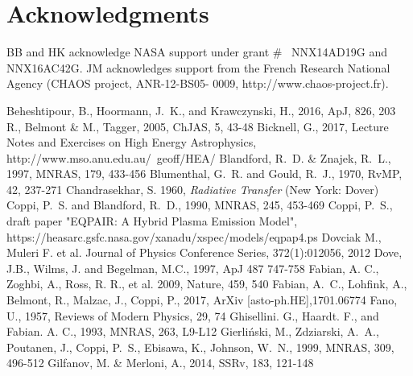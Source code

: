 \documentclass[manuscript]{aastex}
\begin{document}
\section{Acknowledgments}
BB and HK acknowledge NASA support under grant \#~ NNX14AD19G and NNX16AC42G. JM acknowledges support from  the French Research National Agency (CHAOS project, ANR-12-BS05- 0009, http://www.chaos-project.fr). 
\acknowledgments

\begin{thebibliography}{}
 Beheshtipour, B., Hoormann, J.~K., and Krawczynski, H., 2016, ApJ, 826, 203
 R., Belmont \& M., Tagger, 2005, ChJAS, 5, 43-48
 Bicknell, G., 2017, Lecture Notes and Exercises on High Energy Astrophysics, http://www.mso.anu.edu.au/~geoff/HEA/ 
 Blandford, R.~D. \&  Znajek, R.~L., 1997, MNRAS, 179, 433-456
 Blumenthal, G.~R. and Gould, R.~J., 1970, RvMP, 42, 237-271
 Chandrasekhar, S. 1960, {\it Radiative Transfer} (New York: Dover)
 Coppi, P.~S. and Blandford, R.~D., 1990, MNRAS, 245, 453-469
 Coppi, P.~S., draft paper "EQPAIR: A Hybrid Plasma Emission Model", https://heasarc.gsfc.nasa.gov/xanadu/xspec/models/eqpap4.ps
 Dovciak M., Muleri F. et al. Journal of Physics Conference Series, 372(1):012056, 2012
 Dove, J.B., Wilms, J. and Begelman, M.C., 1997, ApJ 487 747-758
 Fabian, A. C., Zoghbi, A., Ross, R. R., et al. 2009, Nature, 459, 540
 Fabian, A.~C., Lohfink, A., Belmont, R., Malzac, J., Coppi, P., 2017, ArXiv [asto-ph.HE],1701.06774 
 Fano, U., 1957, Reviews of Modern Physics, 29, 74
 Ghisellini. G., Haardt. F., and Fabian. A. C., 1993, MNRAS, 263, L9-L12
Gierli{\'n}ski, M., Zdziarski, A.~A., Poutanen, J., Coppi, P.~S., Ebisawa, K., Johnson, W.~N., 1999, MNRAS, 309, 496-512
Gilfanov, M. \& Merloni, A., 2014, SSRv, 183, 121-148


\end{thebibliography}
\end{document}

